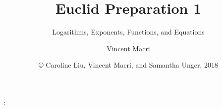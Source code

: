 

\usepackage{cleveref}

\title{Euclid Preparation 1}
\subtitle{Logarithms, Exponents, Functions, and Equations}
\author{Vincent Macri}
\date{\copyright{} Caroline Liu, Vincent Macri, and Samantha Unger, 2018}

\renewcommand\thepart{\Roman{part}}


	\frame{\titlepage}
	\begin{frame}
		: \tableofcontents[part=1]
	\end{frame}
	
	

